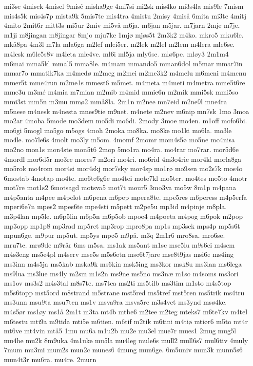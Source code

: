 {mi3se
4misek
4misel
9misé
misha9ge
4mi7si
mi2sk
mis4ko
mi3s4la
mis9le
7mism
mis4s5k
mis4s7p
mista9k
5mis7te
mis4tra
4mistu
2misy
4miså
6mita
mi3te
4mitj
4mito
2mit6r
mitt3s
mi5ur
2miv
mi5vå
m6ja.
m6jan
m5jar.
m7jarn
2mje
m7je.
m1ji
m8jingan
m8jingar
8mjo
mju7ke
1mjø
mjøs5t
2m3k2
m4ko.
mkro5
mku6le.
mkå8pa
4m3l
m7la
mla6ga
m2lef
mlei5er.
m2lek
m2lel
m2lem
m4lera
mle6se.
m4lesk
m6le5s8v
m4leta
mle4ve.
ml6i
ml5ja
mly6se.
mlø6pe.
mløy3
2m1m4
m6mai
mma5kl
mmal5
mma8le.
m4mam
mmando5
mman6dol
m5mar
mmar7in
mmar7o
mmatik7ka
m4medø
m2meg
m2mei
m2me3k2
m4melu
m6meni
m4menu
mmer5t
mme4run
m2me1s
mmest6
m5met.
m4meta
m4meti
m4metra
mme5t6re
mme3u
m3mé
m4mia
m7mian
m2mib
m4mid
mmie6n
m2mik
mmi5sk
mmi5so
mmi3st
mm5n
m3mu
mmø2
mmå8la.
2m1n
m2nee
mn7eid
m2ne9l
mne4ra
m5nese
m4nesk
m4nesta
mnes9tie
m9net.
m4nete
m2nev
m6nip
mn7sk
1mo
3moa
mo2ar
4moba
5mode
mo3dem
mo5di
mo6di.
2mody
3moe
mo4en.
m1off
mofo6bi.
mo6gi
5mogl
mo5go
m5ogs
4moh
2moka
mo8ka.
mo8ke
mo1ki
mo6la.
mo3le
mo4le.
mo7le6s
4molt
mo3ly
m5om.
4momf
2momr
mom4s5ø
mo5ne
mo4nisa
mo2no
mon1s
mon4ste
mon5t6
2mop
5mo1ra
mo4ra.
mo4rar
mo7rar.
mor5d6e
4mordl
mor6d5r
mo3re
mores7
m2ori
mo4ri.
mo6rid
4m3o4rie
mor4kl
morla8ga
mo5rok
mo4rom
mor4si
mor4skj
mor7sky
mor4sp
mo1rø
mo9sen
mo2s7k
mos4o
6mostab
4motap
mo4te.
mo6te6g6e
mo4tei
mote7kl
mo5ter.
mo4tes
mo5to
4motr
mot7re
mot1s2
6motsagd
motsva5
mot7t
mour5
3mo3va
mo5w
8m1p
m4pana
m4p5anta
m4pee
m4pelot
m6pena
m6pep
mpera8te.
mpe5res
m6peress
m4p5erfa
mperi6e7n
mpes2
mpes6te
mpe4sti
m5pett
m2pe5u
mp3id
m4pinje
m8pla.
m3p4lan
mp5le.
m6p5lin
m6p5n
m6p5ob
mpoe4
m4poeta
m4pog
m6pok
m2pop
mp3opp
mp1p8
mp3rad
mp5ret
mp3rop
mpro8pa
mp1s
mp3sek
mps4p
mp5s6t
mpun6ge.
m9pur
mp5ut.
mp5ys
mpø5
m9på.
m3q
2m1r6
mro8sa.
mro6se.
mru7te.
mrø9de
m9rår
6ms
m5sa.
ms1ak
ms5ant
m1sc
mse5lu
m9s6ei
m4sem
m4s3eng
ms5e4pl
m4serv
mse5s
m5s6etn
mse6t7jare
mse8t9jas
msi6e
ms4ing
ms3inn
m4s5ja
ms5kab
mska9k
ms6kin
msk5ing
ms3kor
msk8u
ms3lan
ms6lega
ms9lua
ms3lue
ms4ly
m2sm
m1s2n
ms9ne
ms5no
ms3næ
m1so
m4soms
ms3ori
ms1ov
ms3s2
m4s3tal
m8s7te.
ms7tea
ms2ti
ms5tilb
ms3tim
m1sto
m4s5top
m5s6topp
mst5ord
m8strand
m5strane
mst5red
ms5tref
mst5ren
ms5trik
ms4tru
ms3unn
msu9ta
msu7ten
ms1v
msva9ra
msva5re
m3s4vet
ms3ynd
msø4ke.
m4s5ør
ms1øy
ms1å
2m1t
m3ta
mt4b
mtbe6
m2tee
m2teg
mteks7
m6te7kv
m4tel
m6testu
mti9a
m9tida
mti5e
m6tien.
m6tif
m2tik
m6tini
m4tiø
mtiør6
m5to
mt4r
mt6ve
mt4vin
mtå5
1mu
mu6a
m1u2b
mu2e
mu3el
mue7r
mues1
2mug
mug5l
mu4he
mu2k
8m9uka
4m1uke
mu5la
mu4leg
mule6s
mull2
mull6s7
mul6tiv
4muly
7mum
mu3mi
mum2s
mun2c
munes6
4mung
mun6ge.
6m5univ
mun3k
munn5s6
mun4t3r
mu6ra.
mu4re.
2murn
}
